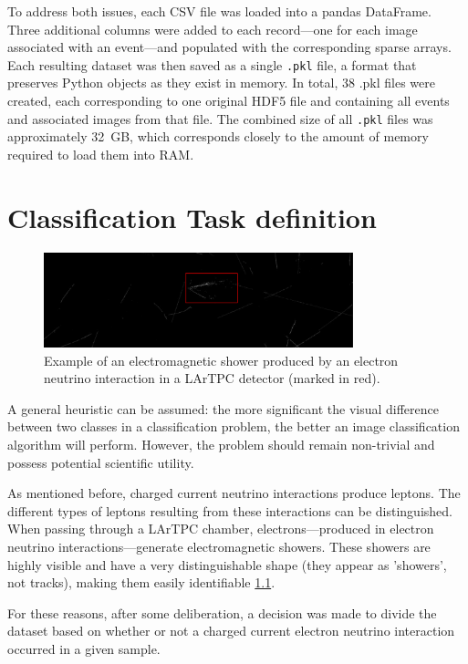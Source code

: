 \documentclass{pracalicmgr}
\begin{document}
To address both issues, each CSV file was loaded into a pandas DataFrame. Three additional columns were added to each record—one for each image associated with an event—and populated with the corresponding sparse arrays. Each resulting dataset was then saved as a single \texttt{.pkl} file, a format that preserves Python objects as they exist in memory. In total, 38 .pkl files were created, each corresponding to one original HDF5 file and containing all events and associated images from that file. The combined size of all \texttt{.pkl} files was approximately 32~GB, which corresponds closely to the amount of memory required to load them into RAM.

\chapter{Classification Task definition}

\begin{figure}[H]
\centering
\includegraphics[width=0.8\textwidth]{src/electronShower.pdf}
\caption{Example of an electromagnetic shower produced by an electron neutrino interaction in a LArTPC detector (marked in red).}
\label{fig:electron_shower}
\end{figure}

A general heuristic can be assumed: the more significant the visual difference between two classes in a classification problem, the better an image classification algorithm will perform. However, the problem should remain non-trivial and possess potential scientific utility.

As mentioned before, charged current neutrino interactions produce leptons. The different types of leptons resulting from these interactions can be distinguished. When passing through a LArTPC chamber, electrons—produced in electron neutrino interactions—generate electromagnetic showers. These showers are highly visible and have a very distinguishable shape (they appear as 'showers', not tracks), making them easily identifiable \ref{fig:electron_shower}.

For these reasons, after some deliberation, a decision was made to divide the dataset based on whether or not a charged current electron neutrino interaction occurred in a given sample.
\end{document}

